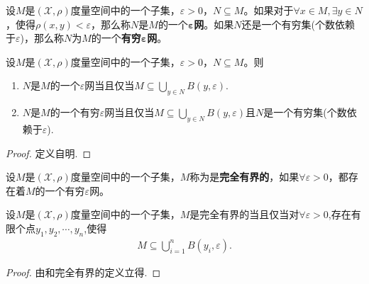 \documentclass[../../main.tex]{subfiles}%
\begin{document}
\begin{definition}
设$M$是$(\mathscr{X},\rho)$度量空间中的一个子集，$\varepsilon>0$，$N\subseteq M$。如果对于$\forall x\in M,\exists y\in N$，使得$\rho(x,y)<\varepsilon$，那么称$N$是$M$的一个$\boldsymbol{\varepsilon }$\textbf{网}。如果$N$还是一个有穷集(个数依赖于$\varepsilon$)，那么称$N$为$M$的一个\textbf{有穷}$\boldsymbol{\varepsilon }$\textbf{网}。
\end{definition}

\begin{proposition}\label{proposition:泛函分析--网的等价定义}
设$M$是$(\mathscr{X},\rho)$度量空间中的一个子集，$\varepsilon>0$，$N\subseteq M$。则
\begin{enumerate}[(1)]
\item $N$是$M$的一个$\varepsilon$网当且仅当$M\subseteq\bigcup\limits_{y\in N}B(y,\varepsilon).$

\item $N$是$M$的一个有穷$\varepsilon$网当且仅当$M\subseteq\bigcup\limits_{y\in N}B(y,\varepsilon)$且$N$是一个有穷集(个数依赖于$\varepsilon$).
\end{enumerate}
\end{proposition}
\begin{proof}

定义自明.
\end{proof}

\begin{definition}
设$M$是$(\mathscr{X},\rho)$度量空间中的一个子集，$M$称为是\textbf{完全有界的}，如果$\forall\varepsilon>0$，都存在着$M$的一个有穷$\varepsilon$网。
\end{definition}

\begin{proposition}
设$M$是$(\mathscr{X},\rho)$度量空间中的一个子集，$M$是完全有界的当且仅当对$\forall \varepsilon >0$,存在有限个点$y_1,y_2,\cdots,y_n$,使得
\begin{align*}
M\subseteq \bigcup_{i=1}^n{B\left( y_i,\varepsilon \right)}.
\end{align*}
\end{proposition}
\begin{proof}

由和完全有界的定义立得.
\end{proof}
\end{document}
